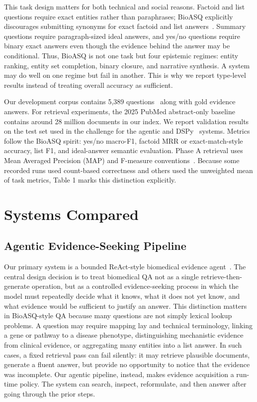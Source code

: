 \documentclass[sigconf,anonymous,review]{acmart}
\begin{document}
This task design matters for both technical and social reasons.
Factoid and list questions require exact entities rather than paraphrases; BioASQ explicitly discourages submitting synonyms for
exact factoid and list answers~\cite{bioasq2026}. Summary questions require
paragraph-sized ideal answers, and yes/no questions require binary exact answers even though the evidence behind the answer
may be conditional. Thus, BioASQ is not one task but four epistemic
regimes: entity ranking, entity set completion, binary closure, and
narrative synthesis. A system may do well on one regime but fail in
another. This is why we report type-level results instead of treating
overall accuracy as sufficient.

Our development corpus contains 5,389 questions~\cite{bioasq2026} along with
gold evidence answers. For retrieval experiments, the 2025 PubMed
abstract-only baseline contains around 28 million documents in
our index. We report validation results on the test set used in the
challenge for the agentic and DSPy~\cite{khattab2023dspy} systems. Metrics follow the
BioASQ spirit: yes/no macro-F1, factoid MRR or exact-match-style
accuracy, list F1, and ideal-answer semantic evaluation. Phase A
retrieval uses Mean Averaged Precision (MAP) and F-measure conventions~\cite{bioasq2026}. Because some recorded runs used count-based correctness and others used the unweighted mean of task metrics, Table 1
marks this distinction explicitly.

\section{Systems Compared}

\subsection{Agentic Evidence-Seeking Pipeline}

Our primary system is a bounded ReAct-style biomedical evidence
agent~\cite{dao2026agentic}. The central design decision is to treat biomedical QA
not as a single retrieve-then-generate operation, but as a controlled
evidence-seeking process in which the model must repeatedly decide what it knows, what it does not yet know, and what evidence
would be sufficient to justify an answer. This distinction matters in
BioASQ-style QA because many questions are not simply lexical
lookup problems. A question may require mapping lay and technical terminology, linking a gene or pathway to a disease phenotype,
distinguishing mechanistic evidence from clinical evidence, or aggregating many entities into a list answer. In such cases, a fixed
retrieval pass can fail silently: it may retrieve plausible documents,
generate a fluent answer, but provide no opportunity to notice that
the evidence was incomplete. Our agentic pipeline, instead, makes
evidence acquisition a run-time policy. The system can search, inspect, reformulate, and then answer after going through the prior
steps.
\end{document}
